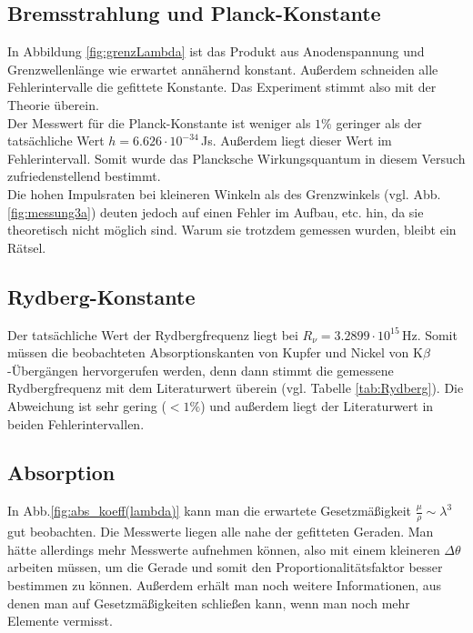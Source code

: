 \documentclass[12pt,a4paper,titlepage,headinclude,bibtotoc]{scrartcl}
\begin{document}
\subsection{Bremsstrahlung und Planck-Konstante}
In Abbildung \ref{fig:grenzLambda} ist das Produkt aus Anodenspannung und Grenzwellenlänge wie  erwartet annähernd konstant.
Außerdem schneiden alle Fehlerintervalle die gefittete Konstante.
Das Experiment stimmt also mit der Theorie überein.\\
Der Messwert für die Planck-Konstante ist weniger als $1\%$ geringer als der tatsächliche Wert $h=6.626\cdot 10^{-34}\,$Js.
Außerdem liegt dieser Wert im Fehlerintervall.
Somit wurde das Plancksche Wirkungsquantum in diesem Versuch zufriedenstellend bestimmt.\\
Die hohen Impulsraten bei kleineren Winkeln als des Grenzwinkels (vgl. Abb.\ref{fig:messung3a}) deuten jedoch auf einen Fehler im Aufbau, etc. hin, da sie theoretisch nicht möglich sind.
Warum sie trotzdem gemessen wurden, bleibt ein Rätsel.

\subsection{Rydberg-Konstante}
Der tatsächliche Wert der Rydbergfrequenz liegt bei $R_\nu=3.2899 \cdot 10^{15}\,\si\hertz$.
Somit müssen die beobachteten Absorptionskanten von Kupfer und Nickel von K$\beta$-Übergängen hervorgerufen werden, denn dann stimmt die gemessene Rydbergfrequenz mit dem Literaturwert überein (vgl. Tabelle \ref{tab:Rydberg}).
Die Abweichung ist sehr gering ($<1\%$) und außerdem liegt der Literaturwert in beiden Fehlerintervallen.

\subsection{Absorption}
In Abb.\ref{fig:abs_koeff(lambda)} kann man die erwartete Gesetzmäßigkeit $\frac{\mu}{\rho}\sim \lambda^3$ gut beobachten.
Die Messwerte liegen alle nahe der gefitteten Geraden.
Man hätte allerdings mehr Messwerte aufnehmen können, also mit einem kleineren $\Delta\theta$ arbeiten müssen, um die Gerade und somit den Proportionalitätsfaktor besser bestimmen zu können.
Außerdem erhält man noch weitere Informationen, aus denen man auf Gesetzmäßigkeiten schließen kann, wenn man noch mehr Elemente vermisst.



\end{document}
